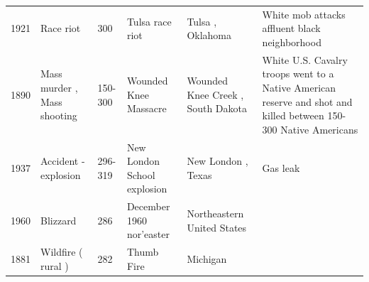 \documentclass{article}
\begin{document}
\begin{tabular}{llllll}
1921 & Race riot & 300 & Tulsa race riot & Tulsa , Oklahoma & White mob attacks affluent black neighborhood \\
1890 & Mass murder , Mass shooting & 150-300 & Wounded Knee Massacre & Wounded Knee Creek , South Dakota & White U.S. Cavalry troops went to a Native American reserve and shot and killed between 150-300 Native Americans \\
1937 & Accident - explosion & 296-319 & New London School explosion & New London , Texas & Gas leak \\
1960 & Blizzard & 286 & December 1960 nor'easter & Northeastern United States &  \\
1881 & Wildfire ( rural ) & 282 & Thumb Fire & Michigan &  \\
\bottomrule
\end{tabular}
\end{document}
